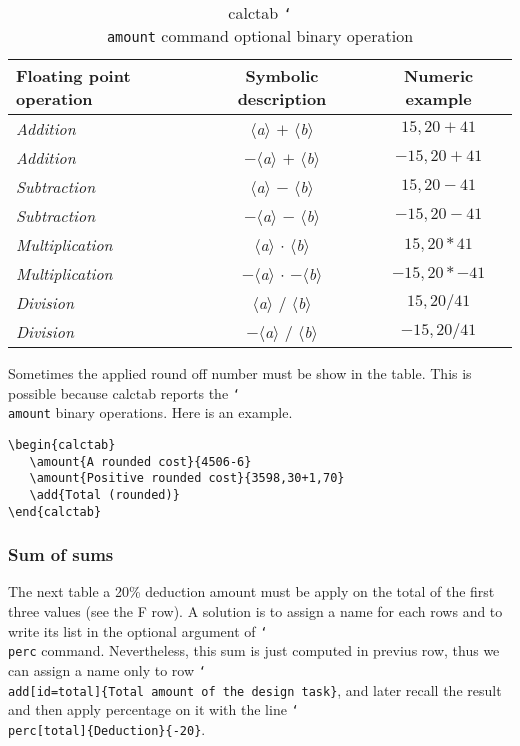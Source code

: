 \documentclass[a4paper]{article}
\newcommand{\env}[1]{\textsf{#1}}
\newcommand{\cmd}[1]{\texttt{\char`\\#1}}
\newcommand{\meta}[1]{\ensuremath{\langle}\emph{#1}\ensuremath{\rangle}}
\begin{document}
\begin{table}[bh]
\centering
\caption{\env{calctab} \cmd{amount} command optional binary operation}
\label{tabOper}
\begin{tabular}{lcc}\toprule
Floating point operation & Symbolic description     & Numeric example\\\midrule
    \emph{Addition}	 &    \meta{a} $+$ \meta{b} & $15{,}20 + 41$\\
    \emph{Addition}	 & $-$\meta{a} $+$ \meta{b} & $-15{,}20 + 41$\\
    \emph{Subtraction}	 &    \meta{a} $-$ \meta{b} & $15{,}20 - 41$\\
    \emph{Subtraction}	 & $-$\meta{a} $-$ \meta{b} & $-15{,}20 - 41$\\
  \emph{Multiplication}	 &    \meta{a} $\cdot$ \meta{b} & $15{,}20 * 41$\\
  \emph{Multiplication}  & $-$\meta{a} $\cdot$ $-$\meta{b} & $-15{,}20 * -41$\\
    \emph{Division}	 &    \meta{a} $/$ \meta{b} & $15{,}20 / 41$\\
    \emph{Division}	 & $-$\meta{a} $/$ \meta{b} & $-15{,}20 / 41$\\\bottomrule
\end{tabular}
\end{table}

Sometimes the applied round off number must be show in the table. This is possible because \env{calctab} reports the \cmd{amount} binary operations. Here is an example.

\begin{calctab}
\end{calctab}

\begin{Verbatim}
\begin{calctab}
   \amount{A rounded cost}{4506-6}
   \amount{Positive rounded cost}{3598,30+1,70}
   \add{Total (rounded)}
\end{calctab}
\end{Verbatim}


\subsubsection{Sum of sums}
The next table a 20\% deduction amount must be apply on the total of the first three values (see the F row). A solution is to assign a name for each rows and to write its list in the optional argument of \cmd{perc} command. Nevertheless, this sum is just computed in previus row, thus we can assign a name only to row \texttt{\cmd{add}[id=total]\{Total amount of the design task\}}, and later recall the result and then apply percentage on it with the line \texttt{\cmd{perc}[total]\{Deduction\}\{-20\}}.
\end{document}
